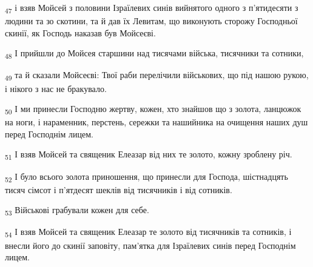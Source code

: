 \begin{tcolorbox}
\textsubscript{47} і взяв Мойсей з половини Ізраїлевих синів вийнятого одного з п'ятидесяти з людини та зо скотини, та й дав їх Левитам, що виконують сторожу Господньої скинії, як Господь наказав був Мойсеєві.
\end{tcolorbox}
\begin{tcolorbox}
\textsubscript{48} І прийшли до Мойсея старшини над тисячами війська, тисячники та сотники,
\end{tcolorbox}
\begin{tcolorbox}
\textsubscript{49} та й сказали Мойсеєві: Твої раби перелічили військових, що під нашою рукою, і нікого з нас не бракувало.
\end{tcolorbox}
\begin{tcolorbox}
\textsubscript{50} І ми принесли Господню жертву, кожен, хто знайшов що з золота, ланцюжок на ноги, і нараменник, перстень, сережки та нашийника на очищення наших душ перед Господнім лицем.
\end{tcolorbox}
\begin{tcolorbox}
\textsubscript{51} І взяв Мойсей та священик Елеазар від них те золото, кожну зроблену річ.
\end{tcolorbox}
\begin{tcolorbox}
\textsubscript{52} І було всього золота приношення, що принесли для Господа, шістнадцять тисяч сімсот і п'ятдесят шеклів від тисячників і від сотників.
\end{tcolorbox}
\begin{tcolorbox}
\textsubscript{53} Військові грабували кожен для себе.
\end{tcolorbox}
\begin{tcolorbox}
\textsubscript{54} І взяв Мойсей та священик Елеазар те золото від тисячників та сотників, і внесли його до скинії заповіту, пам'ятка для Ізраїлевих синів перед Господнім лицем.
\end{tcolorbox}
